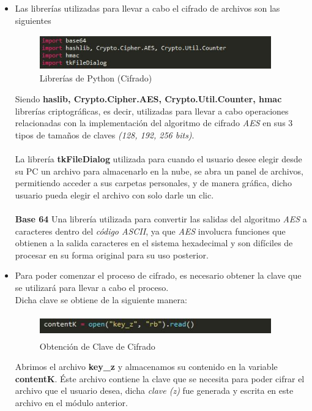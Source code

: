 	\begin{itemize}
		\item Las librerías utilizadas para llevar a cabo el cifrado de archivos son las siguientes
			\begin{figure}[H]
			\centering
			\includegraphics[width=10cm, height=1.5cm]{./images/cifrado/01.jpg}
			\caption{Librerías de Python (Cifrado)}
			\label{fig:6-2-1} 
			\end{figure} 
		Siendo \textbf{haslib, Crypto.Cipher.AES, Crypto.Util.Counter, hmac} librerías criptográficas, es decir, utilizadas para llevar a cabo operaciones relacionadas con la implementación del algoritmo de cifrado \textit{AES} en sus 3 tipos de tamaños de claves \textit{(128, 192, 256 bits)}.\\ \\ 
La librería \textbf{tkFileDialog} utilizada para cuando el usuario desee elegir desde su PC un archivo para almacenarlo en la nube, se abra un panel de archivos, permitiendo acceder a sus carpetas personales, y de manera gráfica, dicho usuario pueda elegir el archivo con solo darle un clic. \\ \\ 
\textbf{Base 64} Una librería utilizada para convertir las salidas del algoritmo \textit{AES} a caracteres dentro del \textit{código ASCII}, ya que \textit{AES} involucra funciones que obtienen a la salida caracteres en el sistema hexadecimal y son difíciles de procesar en su forma original para su uso posterior. 


		\item Para poder comenzar el proceso de cifrado, es necesario obtener la clave que se utilizará para llevar a cabo el proceso. \\ Dicha clave se obtiene de la siguiente manera: 
			\begin{figure}[H]
			\centering
			\includegraphics[width=10cm, height=1cm]{./images/cifrado/02.jpg}
			\caption{Obtención de Clave de Cifrado}
			\label{fig:6-2-2} 
			\end{figure} 
	Abrimos el archivo \textbf{key\_z} y almacenamos su contenido en la variable \textbf{contentK}. Éste archivo contiene la clave que se necesita para poder cifrar el archivo que el usuario desea, dicha \textit{clave (z)} fue generada y escrita en este archivo en el módulo anterior. 


\end{itemize}
